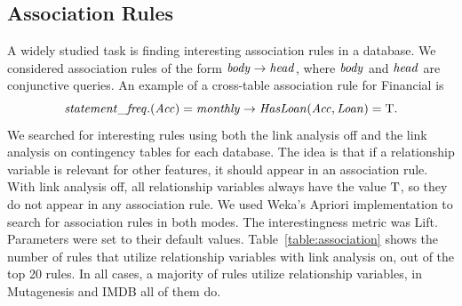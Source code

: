 \documentclass{sig-alternate-2013}
\begin{document}
\subsection{Association Rules} A widely studied task is finding interesting association rules in a database. We considered association rules of the form $\it{body} \rightarrow \it{head}$, where $\it{body}$ and $\it{head}$ are conjunctive queries. An example of a cross-table association rule for Financial is 
%
$$\it{statement\_freq.(Acc)} = \it{monthly} \rightarrow \it{HasLoan}(\it{Acc},\it{Loan}) = \mathrm{T}.$$
%
We searched for interesting rules using both the link analysis off and the link analysis on contingency tables for each database. The idea is that if a relationship variable is relevant for other features, it should appear in an association rule. With link analysis off, all relationship variables always have the value $\mathrm{T}$, so they do not appear in any association rule. We used Weka's Apriori implementation to search for association rules in both modes. The interestingness metric was Lift. Parameters were set to their default values. Table~\ref{table:association} shows the number of rules that utilize relationship variables with link analysis on, out of the top 20 rules. In all cases, a majority of rules utilize relationship variables,  in Mutagenesis and IMDB all of them do. %
%
\begin{table}[htbp] \centering
{}
\caption{Number of top 20 Association Rules that utilize relationship variables.}
  \label{table:association}%
\end{table}%
\end{document}
